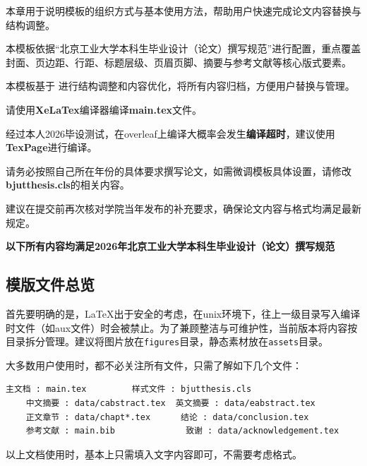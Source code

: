 \label{chap:intro}
\linespread{1.08}\selectfont


本章用于说明模板的组织方式与基本使用方法，帮助用户快速完成论文内容替换与结构调整。

本模板依据“北京工业大学本科生毕业设计（论文）撰写规范”进行配置，重点覆盖封面、页边距、行距、标题层级、页眉页脚、摘要与参考文献等核心版式要素。

本模板基于 \color{red}{https://github.com/hw401/BJUT-Undergraduate-Thesis} 进行结构调整和内容优化，将所有内容归档，方便用户替换与管理。

请使用\textbf{{\color{red}XeLaTex}}编译器编译\textbf{{\color{red}main.tex}}文件。

经过本人2026毕设测试，在overleaf上编译大概率会发生\textbf{编译超时}，建议使用\textbf{TexPage}进行编译。

请务必按照自己所在年份的具体要求撰写论文，如需微调模板具体设置，请修改\textbf{{\color{red}bjutthesis.cls}}的相关内容。

建议在提交前再次核对学院当年发布的补充要求，确保论文内容与格式均满足最新规定。

\textbf{\color{red} {以下所有内容均满足2026年北京工业大学本科生毕业设计（论文）撰写规范}}

\label{sec:fst}

\subsection{模版文件总览}
首先要明确的是，\LaTeX 出于安全的考虑，在unix环境下，往上一级目录写入编译时文件（如aux文件）时会被禁止。为了兼顾整洁与可维护性，当前版本将内容按目录拆分管理。建议将图片放在\verb|figures|目录，静态素材放在\verb|assets|目录。

大多数用户使用时，都不必关注所有文件，只需了解如下几个文件：

\begin{center}
  \begin{minipage}{0.95\textwidth}
    \begin{Verbatim}[frame=single]
    主文档 : main.tex         样式文件 : bjutthesis.cls
    中文摘要 : data/cabstract.tex  英文摘要 : data/eabstract.tex
    正文章节 : data/chapt*.tex      结论 : data/conclusion.tex
    参考文献 : main.bib              致谢 : data/acknowledgement.tex
    \end{Verbatim}
  \end{minipage}
\end{center}

以上文档使用时，基本上只需填入文字内容即可，不需要考虑格式。

